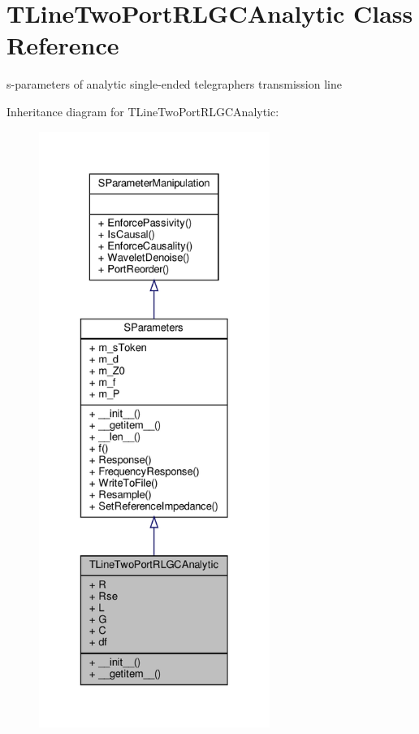 \hypertarget{classSignalIntegrity_1_1SParameters_1_1Devices_1_1TLineTwoPortRLGCAnalytic_1_1TLineTwoPortRLGCAnalytic}{}\section{T\+Line\+Two\+Port\+R\+L\+G\+C\+Analytic Class Reference}
\label{classSignalIntegrity_1_1SParameters_1_1Devices_1_1TLineTwoPortRLGCAnalytic_1_1TLineTwoPortRLGCAnalytic}


s-\/parameters of analytic single-\/ended telegraphers transmission line  




Inheritance diagram for T\+Line\+Two\+Port\+R\+L\+G\+C\+Analytic\+:\nopagebreak
\begin{figure}[H]
\begin{center}
\leavevmode
\includegraphics[height=550pt]{classSignalIntegrity_1_1SParameters_1_1Devices_1_1TLineTwoPortRLGCAnalytic_1_1TLineTwoPortRLGCAnalytic__inherit__graph}
\end{center}
\end{figure}


